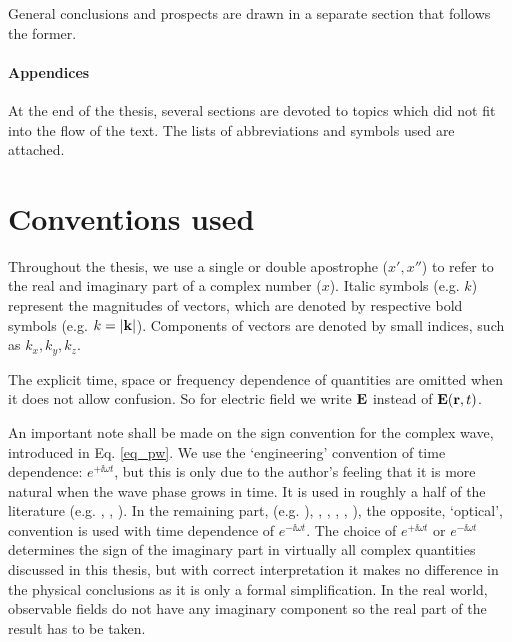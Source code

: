 General conclusions and prospects are drawn in a separate section that follows the former.
\paragraph{Appendices} %
At the end of the thesis, several sections are devoted to topics which did not fit into the flow of the text. 
The lists of abbreviations and symbols used are attached.


\section{Conventions used}%
Throughout the thesis, we use a single or double apostrophe ($x', x''$) to refer to the real and imaginary part of a complex number ($x$). Italic symbols (e.g. $k$) represent the magnitudes of vectors, which are denoted by respective bold symbols (e.g. $k = |{\mathbf{k}}|$). Components of vectors are denoted by small indices, such as $k_x, k_y, k_z$. 

The explicit time, space or frequency dependence of quantities are omitted when it does not allow confusion. So for electric field we write $\mathbf{E}$ instead of $\mathbf{E}({\mathbf{r}},t)$.

An important note shall be made on the sign convention for the complex wave, introduced in Eq. \ref{eq_pw}.
We use the `engineering' convention of time dependence: $e^{+\ii \omega t}$, but this is only due to the author's feeling that it is more natural when the wave phase grows in time. 
It is used in  roughly a half of the literature (e.g. \cite[p. 9]{engheta2006book}, \cite[pp. 21, 99]{krowne2007book}, \cite[(Chapters 1-4, 6, 9, 10)]{eleftheriades2005book}).  In the remaining part, (e.g. \cite[(Chapters 5, 7, 8)]{eleftheriades2005book}), \cite{klingshirn2007semiconductor}, \cite{jackson1962book}, \cite{veselago1968}, \cite{born1999book}, \cite[p. 5]{noginov2011book}), the opposite, `optical', convention is used with time dependence of $e^{-\ii \omega t}$. The choice of $e^{+\ii\omega t}$ or $e^{-\ii\omega t}$ determines the sign of the imaginary part in virtually all complex quantities discussed in this thesis, but with correct interpretation it makes no difference in the physical conclusions as it is only a formal simplification.
In the real world, observable fields do not have any imaginary component so the real part of the result has to be taken. 

